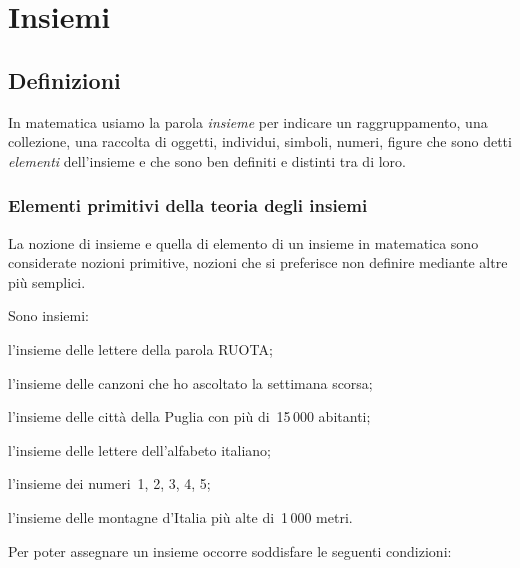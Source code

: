 


\chapter{Insiemi}

\section{Definizioni}
\label{sec:insiemi_definizioni}

In matematica usiamo la parola \textit{insieme} per indicare un
raggruppamento, una collezione, una raccolta di oggetti, individui,
simboli, numeri, figure che sono detti \textit{elementi}
dell'insieme e che sono ben definiti e distinti tra di
loro.

\subsection{Elementi primitivi della teoria degli insiemi}
\label{subsec:el_prim}

La nozione di insieme e quella di elemento di un insieme in matematica
sono considerate nozioni primitive, nozioni che si preferisce non
definire mediante altre più semplici.

\begin{exrig}
 \begin{esempio}
 Sono insiemi:
 \begin{enumeratea}
  \item l'insieme delle lettere della parola RUOTA;
  \item l'insieme delle canzoni che ho ascoltato la settimana scorsa;
  \item l'insieme delle città della Puglia con più di~15\,000 abitanti;
  \item l'insieme delle lettere dell'alfabeto italiano;
  \item l'insieme dei numeri~1, 2, 3, 4, 5;
  \item l'insieme delle montagne d'Italia più alte di~1\,000 metri.
 \end{enumeratea}
 \end{esempio}
\end{exrig}

Per poter assegnare un insieme occorre soddisfare le seguenti condizioni:

